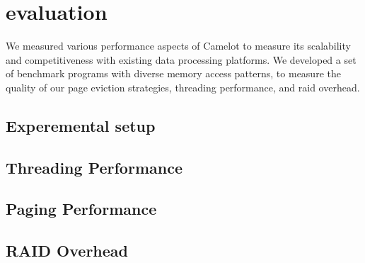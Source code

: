 \section{evaluation}
\label{sec:eval}

We measured various performance aspects of Camelot to measure its
scalability and competitiveness with existing data processing
platforms. We developed a set of benchmark programs with diverse
memory access patterns, to measure the quality of our page eviction
strategies, threading performance, and raid overhead.

\subsection{Experemental setup}

\subsection{Threading Performance}

\subsection{Paging Performance}

\subsection{RAID Overhead}
